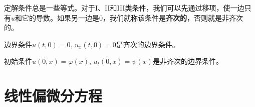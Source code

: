 定解条件总是一些等式。对于I、II和III类条件，我们可以先通过移项，使一边只有$u$和它的导数。如果另一边是$0$，我们就称该条件是\textbf{齐次的}，否则就是非齐次的。
\begin{problembox}
    \begin{example}
        边界条件$u(t, 0) = 0,\, u_x(t, 0) = 0$是齐次的边界条件。
    \end{example}
    \begin{example}
        初始条件$u(0, x) = \varphi(x),\, u_t(0, x) = \psi(x)$是非齐次的边界条件。
    \end{example}
\end{problembox}

\section{线性偏微分方程}
